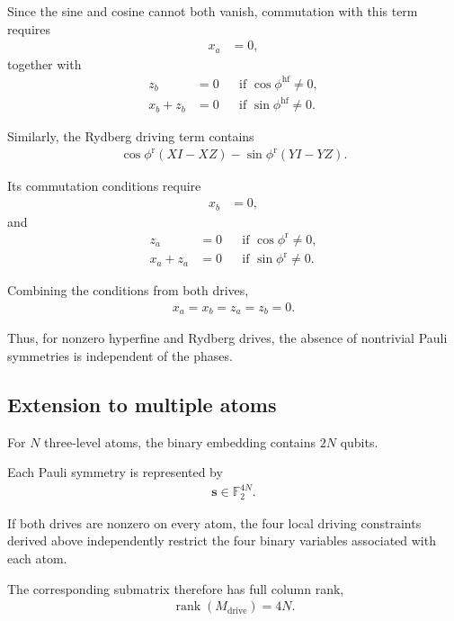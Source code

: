 \documentclass[amssymb,twocolumn,aps]{revtex4-2}
\begin{document}
Since the sine and cosine cannot both vanish,
commutation with this term requires
\begin{align*}
    x_a &= 0,
\end{align*}
together with
\begin{align*}
    z_b&=0
    &&\text{if }\cos\phi^{\mathrm{hf}}\neq0,\\
    x_b+z_b&=0
    &&\text{if }\sin\phi^{\mathrm{hf}}\neq0.
\end{align*}

Similarly, the Rydberg driving term contains
\begin{align*}
    \cos\phi^{\mathrm{r}}(XI-XZ)
    -\sin\phi^{\mathrm{r}}(YI-YZ).
\end{align*}

Its commutation conditions require
\begin{align*}
    x_b &= 0,
\end{align*}
and
\begin{align*}
    z_a&=0
    &&\text{if }\cos\phi^{\mathrm{r}}\neq0,\\
    x_a+z_a&=0
    &&\text{if }\sin\phi^{\mathrm{r}}\neq0.
\end{align*}

Combining the conditions from both drives,
\begin{align*}
    x_a=x_b=z_a=z_b=0.
\end{align*}

Thus, for nonzero hyperfine and Rydberg
drives, the absence of nontrivial Pauli
symmetries is independent of the phases.

\subsection*{Extension to multiple atoms}

For $N$ three-level atoms, the binary
embedding contains $2N$ qubits.

Each Pauli symmetry is represented by
\begin{align*}
    \mathbf{s}\in\mathbb{F}_2^{4N}.
\end{align*}

If both drives are nonzero on every atom,
the four local driving constraints derived
above independently restrict the four binary
variables associated with each atom.

The corresponding submatrix therefore
has full column rank,
\begin{align*}
    \operatorname{rank}(M_{\mathrm{drive}})=4N.
\end{align*}
\end{document}
